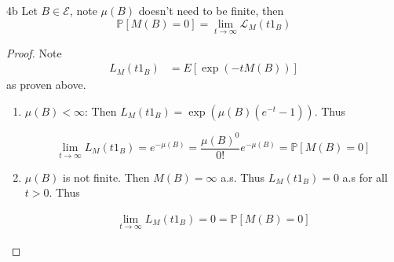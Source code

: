 \documentclass{article}
\newcommand{\PR}{\mathbb{P}}
\newcommand{\Ec}[0]{\mathcal{E}}
\newcommand{\Lc}[0]{\mathcal{L}}
\begin{document}
\begin{claim}{4b}\label{Claim 4b.}
    Let $B \in \Ec$, note $\mu(B)$ doesn't need to be finite, then \[\PR\left[M(B) = 0\right] = \lim_{t \to \infty} \Lc_{M}(t 1_{B})\]   
\end{claim}
\begin{proof}
    Note
    \begin{align*}
        L_M(t 1_B) &= E[\exp(-t M(B))]
    \end{align*}
    as proven above. 

    \begin{enumerate}
        \item $\mu(B) < \infty$: Then $L_M(t 1_B) = \exp(\mu(B)(e^{-t} - 1))$. Thus 
        
        \[\lim_{t \to \infty} L_M(t 1_B) = e^{-\mu(B)} = \frac{\mu(B)^0}{0!} e^{- \mu(B)} = \PR[M(B)  = 0 ]\]

        \item $\mu(B)$ is not finite. Then $M(B) = \infty$ a.s. Thus $L_M(t 1_B) = 0$ a.s for all $t > 0$. Thus 
        
        \begin{align*}
            \lim_{t \to \infty} L_M(t 1_B) = 0 = \PR[M(B) = 0]
        \end{align*}
    \end{enumerate}
\end{proof}

\bigskip
\end{document}
